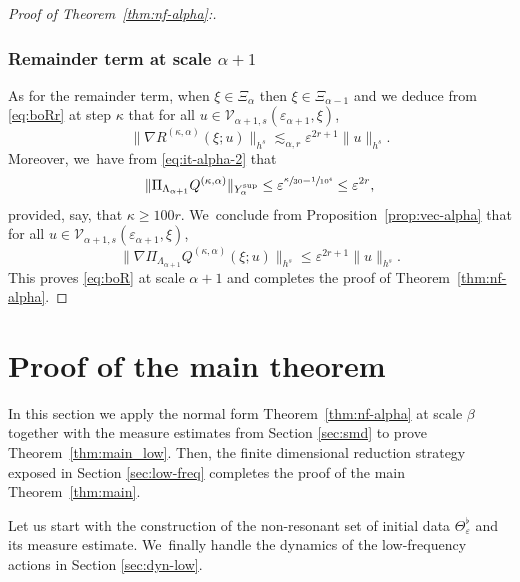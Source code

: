 \documentclass[JEP,XML,SOM,Unicode,published]{cedram}
\theoremstyle{plain}
\theoremstyle{definition}
\newcommand{\1}{\mathbf{1}}
\newcommand{\Ysup}[1]{Y_{#1}^{\mathrm{sup}}}
\let\epsilon\varepsilon
\begin{document}
\begin{proof}[Proof of Theorem~\ref{thm:nf-alpha}:]
\subsubsection*{Remainder term at scale $\alpha+1$} As for the remainder term, when $\xi\in\Xi_{\alpha}$ then $\xi\in\Xi_{\alpha-1}$ and we deduce from \eqref{eq:boRr} at step $\kappa$ that for all $u\in\mathcal{V}_{\alpha+1,s}(\epsilon_{\alpha+1}, \xi)$,
\[
\|\nabla R^{(\kappa,\alpha)}(\xi;u)\|_{h^{s}}
\lesssim_{\alpha,r}
\epsilon^{2r+1}
\|u\|_{h^{s}}.
\]
Moreover, we~have from \eqref{eq:it-alpha-2} that
\[
\|\Pi_{\Lambda_{\alpha+1}}Q^{(\kappa,\alpha)}
\|_{\Ysup{\alpha}}
\leq \epsilon^{\sfrac{\kappa}{30}-\sfrac{1}{10^{4}}} \leq \epsilon^{2r},
\]
provided, say, that $\kappa\geq100r$. We~conclude from Proposition~\ref{prop:vec-alpha} that for all $u\in\mathcal{V}_{\alpha+1,s}(\epsilon_{\alpha+1},\xi)$,
\[
\|\nabla \Pi_{\Lambda_{\alpha+1}}Q^{(\kappa,\alpha)}(\xi;
u)\|_{h^{s}}
\leq \epsilon^{2r+1}\|u\|_{h^{s}}.
\]
This proves \eqref{eq:boR} at scale $\alpha+1$ and completes the proof of Theorem~\ref{thm:nf-alpha}.
\end{proof}

\section{Proof of the main theorem}
\label{sec:pr-thm}

In this section we apply the normal form Theorem~\ref{thm:nf-alpha} at scale $\beta$ together with the measure estimates from Section \ref{sec:smd} to prove Theorem~\ref{thm:main_low}. Then, the finite dimensional reduction strategy exposed in Section \ref{sec:low-freq} completes the proof of the main Theorem~\ref{thm:main}.

Let us start with the construction of the non-resonant set of initial data $\Theta_{\epsilon}^{\flat}$ and its measure estimate. We~finally handle the dynamics of the low-frequency actions in Section \ref{sec:dyn-low}.
\end{document}
